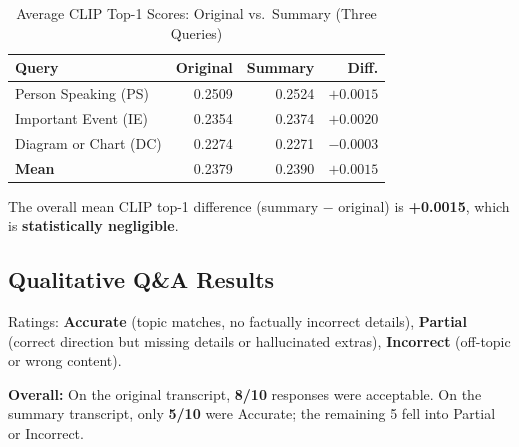 \documentclass[10pt,conference]{IEEEtran}
\begin{document}
\begin{table}[H]
\centering
\caption{Average CLIP Top-1 Scores: Original vs.\ Summary (Three Queries)}
\label{tab:clip_scores}
\begin{tabular}{lrrr}
\toprule
\textbf{Query} & \textbf{Original} & \textbf{Summary} & \textbf{Diff.} \\
\midrule
Person Speaking (PS)        & 0.2509 & 0.2524 & $+0.0015$ \\
Important Event (IE)        & 0.2354 & 0.2374 & $+0.0020$ \\
Diagram or Chart (DC)       & 0.2274 & 0.2271 & $-0.0003$ \\
\midrule
\textbf{Mean}               & 0.2379 & 0.2390 & $+0.0015$ \\
\bottomrule
\end{tabular}
\end{table}

The overall mean CLIP top-1 difference (summary $-$ original) is
\textbf{+0.0015}, which is \textbf{statistically negligible}.

\subsection{Qualitative Q\&A Results}

Ratings: \textbf{Accurate} (topic matches, no factually incorrect details),
\textbf{Partial} (correct direction but missing details or hallucinated extras),
\textbf{Incorrect} (off-topic or wrong content).

\textbf{Overall:} On the original transcript, \textbf{8/10} responses were
acceptable. On the summary transcript, only \textbf{5/10} were Accurate; the
remaining 5 fell into Partial or Incorrect.
\end{document}
